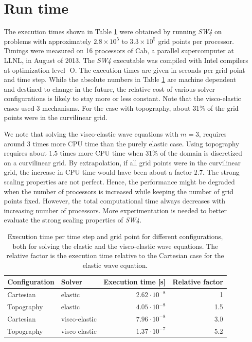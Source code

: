 \documentclass[11pt]{report}
\begin{document}
\section{Run time}

The execution times shown in Table \ref{tab:cputime-usage} were obtained by running \emph{SW4} on
problems with approximately $2.8\times 10^5$ to $3.3\times 10^5$ grid points per processor. Timings
were measured on 16 processors of Cab, a parallel supercomputer at LLNL, in August of 2013. The
\emph{SW4} executable was compiled with Intel compilers at optimization level -O. The execution
times are given in seconds per grid point and time step.  While the absolute numbers in Table
\ref{tab:cputime-usage} are machine dependent and destined to change in the future, the relative
cost of various solver configurations is likely to stay more or less constant. Note that the
visco-elastic cases used 3 mechanisms. For the case with topography, about 31\% of the grid points
were in the curvilinear grid.

We note that solving the visco-elastic wave equations with $m=3$, requires around 3 times more CPU
time than the purely elastic case. Using topography requires about 1.5 times more CPU time when 31\%
of the domain is discretized on a curvilinear grid. By extrapolation, if all grid points were in the
curvilinear grid, the increase in CPU time would have been about a factor 2.7.  The strong scaling
properties are not perfect. Hence, the performance might be degraded when the number of processors
is increased while keeping the number of grid points fixed. However, the total computational time
always decreases with increasing number of processors. More experimentation is needed to better
evaluate the strong scaling properties of \emph{SW4}.
\begin{table}
\begin{center}
\begin{tabular}{|l|l|r|r|}\hline
Configuration              & Solver        & Execution time [s] & Relative factor \\ \hline\hline
Cartesian   & elastic       & $2.62\cdot 10^{-8}$ & 1 \\ \hline
Topography  & elastic       & $4.05\cdot 10^{-8}$ & 1.5 \\ \hline
Cartesian   & visco-elastic & $7.96\cdot 10^{-8}$ & 3.0\\ \hline
Topography  & visco-elastic & $1.37\cdot 10^{-7}$ & 5.2\\ \hline
\end{tabular}
\end{center}
\caption{Execution time per time step and grid point for different configurations, both for
  solving the elastic and the visco-elastic wave equations. The relative factor is the execution time
   relative to the Cartesian case for the elastic wave equation.}\label{tab:cputime-usage}
 \end{table}
\end{document}
